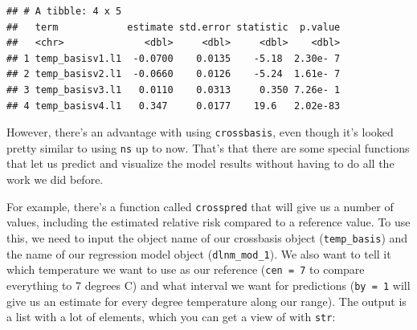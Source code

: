 \documentclass[
]{book}
\newenvironment{Shaded}{\begin{snugshade}}{\end{snugshade}}
\newcommand{\DataTypeTok}[1]{\textcolor[rgb]{0.13,0.29,0.53}{#1}}
\newcommand{\DecValTok}[1]{\textcolor[rgb]{0.00,0.00,0.81}{#1}}
\newcommand{\KeywordTok}[1]{\textcolor[rgb]{0.13,0.29,0.53}{\textbf{#1}}}
\newcommand{\NormalTok}[1]{#1}
\newcommand{\OperatorTok}[1]{\textcolor[rgb]{0.81,0.36,0.00}{\textbf{#1}}}
\newcommand{\StringTok}[1]{\textcolor[rgb]{0.31,0.60,0.02}{#1}}
\begin{document}
\begin{verbatim}
## # A tibble: 4 x 5
##   term            estimate std.error statistic  p.value
##   <chr>              <dbl>     <dbl>     <dbl>    <dbl>
## 1 temp_basisv1.l1  -0.0700    0.0135    -5.18  2.30e- 7
## 2 temp_basisv2.l1  -0.0660    0.0126    -5.24  1.61e- 7
## 3 temp_basisv3.l1   0.0110    0.0313     0.350 7.26e- 1
## 4 temp_basisv4.l1   0.347     0.0177    19.6   2.02e-83
\end{verbatim}

However, there's an advantage with using \texttt{crossbasis}, even though it's looked pretty similar
to using \texttt{ns} up to now. That's that there are some special functions that let us predict
and visualize the model results without having to do all the work we did before.

For example, there's a function called \texttt{crosspred} that will give us a number of values,
including the estimated relative risk compared to a reference value. To use this, we
need to input the object name of our crossbasis object (\texttt{temp\_basis}) and the name of our
regression model object (\texttt{dlnm\_mod\_1}). We also want to tell it which temperature we want
to use as our reference (\texttt{cen\ =\ 7} to compare everything to 7 degrees C) and what interval
we want for predictions (\texttt{by\ =\ 1} will give us an estimate for every degree temperature
along our range). The output is a list with a lot of elements, which you can get a view of
with \texttt{str}:

\begin{Shaded}
\end{Shaded}
\end{document}
